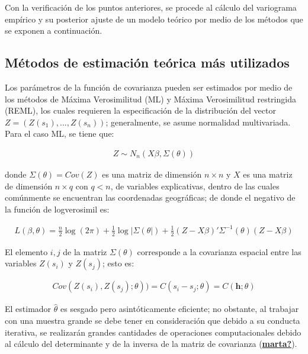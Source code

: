 \documentclass[
]{book}
\begin{document}
Con la verificación de los puntos anteriores, se procede al cálculo del variograma empírico y su posterior ajuste de un modelo teórico por medio de los métodos que se exponen a continuación.

\hypertarget{muxe9todos-de-estimaciuxf3n-teuxf3rica-muxe1s-utilizados}{%
\subsection{Métodos de estimación teórica más utilizados}\label{muxe9todos-de-estimaciuxf3n-teuxf3rica-muxe1s-utilizados}}

Los parámetros de la función de covarianza pueden ser estimados por medio de los métodos de Máxima Verosimilitud (ML) y Máxima Verosimilitud restringida (REML), los cuales requieren la especificación de la distribución del vector \(Z=(Z(s_1),...,Z(s_n))\); generalmente, se asume normalidad multivariada. Para el caso ML, se tiene que:

\begin{align}
  Z\sim N_n(X\beta,\Sigma(\theta))  
\end{align}

donde \(\Sigma(\theta)=Cov(Z)\) es una matriz de dimensión \(n \times n\) y \(X\) es una matriz de dimensión \(n\times q\) con \(q<n\), de variables explicativas, dentro de las cuales comúnmente se encuentran las coordenadas geográficas; de donde el negativo de la función de logverosimil es:

\begin{align}
   L(\beta,\theta)=\frac{n}{2}\log(2\pi)+\frac{1}{2} \log|\Sigma(\theta|)+\frac{1}{2}(Z-X\beta)'\Sigma^{-1}(\theta)(Z-X\beta) 
\end{align}

El elemento \(i,j\) de la matriz \(\Sigma(\theta)\) corresponde a la covarianza espacial entre las variables \(Z(s_i)\) y \(Z(s_j)\); esto es:

\begin{align}
  Cov(Z(s_i),Z(s_j);\theta))=C(s_i-s_j;\theta)=C(\textbf{h};\theta)  
\end{align}

El estimador \(\hat{\theta}\) es sesgado pero asintóticamente eficiente; no obstante, al trabajar con una muestra grande se debe tener en consideración que debido a su conducta iterativa, se realizarán grandes cantidades de operaciones computacionales debido al cálculo del determinante y de la inversa de la matriz de covarianza (\protect\hyperlink{ref-marta}{\textbf{marta?}}).
\end{document}
